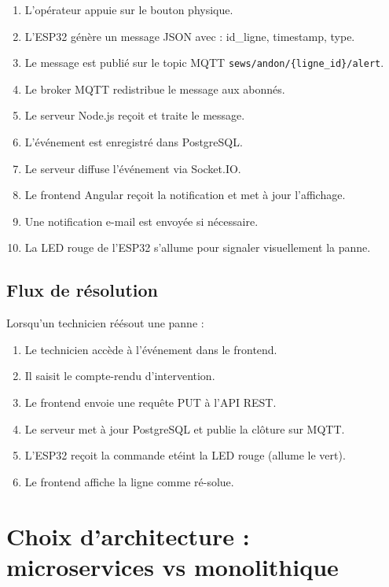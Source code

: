 \begin{enumerate}
    \item L'op\'erateur appuie sur le bouton physique.
    \item L'ESP32 g\'en\`ere un message JSON avec : id\_ligne, timestamp, type.
    \item Le message est publi\'e sur le topic MQTT \texttt{sews/andon/\{ligne\_id\}/alert}.
    \item Le broker MQTT redistribue le message aux abonn\'es.
    \item Le serveur Node.js re\c{c}oit et traite le message.
    \item L'\'ev\'enement est enregistr\'e dans PostgreSQL.
    \item Le serveur diffuse l'\'ev\'enement via Socket.IO.
    \item Le frontend Angular re\c{c}oit la notification et met \`a jour l'affichage.
    \item Une notification e-mail est envoy\'ee si n\'ecessaire.
    \item La LED rouge de l'ESP32 s'allume pour signaler visuellement la panne.
\end{enumerate}

\subsection{Flux de r\'esolution}

Lorsqu'un technicien r\'e\'esout une panne :

\begin{enumerate}
    \item Le technicien acc\`ede \`a l'\'ev\'enement dans le frontend.
    \item Il saisit le compte-rendu d'intervention.
    \item Le frontend envoie une requ\^ete PUT \`a l'API REST.
    \item Le serveur met \`a jour PostgreSQL et publie la cl\^oture sur MQTT.
    \item L'ESP32 re\c{c}oit la commande et\'eint la LED rouge (allume le vert).
    \item Le frontend affiche la ligne comme r\'e-solue.
\end{enumerate}

\section{Choix d'architecture : microservices vs monolithique}

